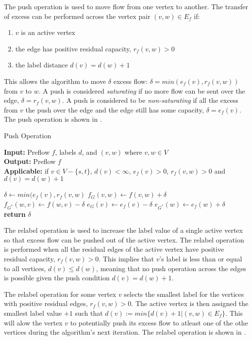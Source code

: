 \begin{definition}
	The push operation is used to move flow from one vertex to another. The transfer of excess can be performed across the vertex pair $(v,w) \in E_f$ if:
	\begin{enumerate}
		\item $v$ is an active vertex
		\item the edge has positive residual capacity, $r_f(v,w)>0$
		\item the label distance $d(v) = d(w)+1$
	\end{enumerate}
	
	This allows the algorithm to move $\delta$ excess flow: $\delta = min (e_f(v), r_f(v,w))$ from $v$ to $w$. A push is considered \textit{saturating} if no more flow can be sent over the edge, $\delta = r_f(v,w)$. A push is considered to be \textit{non-saturating} if all the excess from $v$ the push over the edge and the edge still has some capacity, $\delta = e_f(v)$. The push operation is shown in .
\end{definition}

\begin{algorithm}[!t]
	\caption{Push Operation}\label{alg:push}
	\textbf{Input:} Preflow $f$, labels $d$, and $(v,w)$ where $v,w \in V$\\
	\textbf{Output:} Preflow $f$\\
	\textbf{Applicable:} if $v \in V-\{s,t\}$, $d(v) < \infty$, $e_f(v)>0$, $r_f(v,w)>0$ and $d(v)=d(w)+1$
	\begin{algorithmic}[1]
		\State $\delta \gets min(e_f(v), r_f(v,w)$
		\State $f_G(v,w) \gets f(v,w) + \delta$
		\State $f_{G^*}(w,v) \gets f(w,v) - \delta$
		\State $e_{G}(v) \gets e_f(v) - \delta$
		\State $e_{G^*}(w) \gets e_f(w) + \delta$
		\State \textbf{return} $\delta$
		\EndProcedure
	\end{algorithmic}
\end{algorithm}
	
\begin{definition}
	The relabel operation is used to increase the label value of a single active vertex so that excess flow can be pushed out of the active vertex. The relabel operation is performed when all the residual edges of the active vertex have positive residual capacity, $r_f(v,w)>0$. This implies that $v$'s label is less than or equal to all vertices, $d(v) \leq d(w)$, meaning that no push operation across the edges is possible given the push condition $d(v) = d(w)+1$.
	
	The relabel operation for some vertex $v$ selects the smallest label for the vertices with positive residual edges, $r_f(v,w)>0$. The active vertex is then assigned the smallest label value $+1$ such that $d(v) := min\{d(v)+1 | (v,w) \in E_f\}$. This will alow the vertex $v$ to potentially push its excess flow to atleast one of the othe vertices during the algorithm's next iteration. The relabel operation is shown in .
\end{definition}

